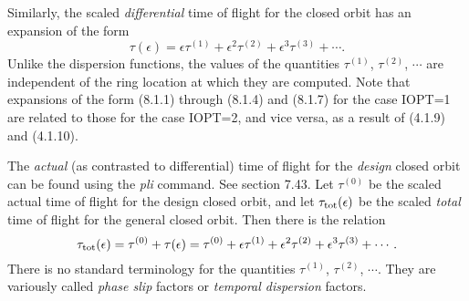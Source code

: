 Similarly, the scaled {\em differential} time of flight for the closed orbit has
an expansion of the form
\begin{equation}
\tau (\epsilon ) = \epsilon \tau^{(1)} + \epsilon^2 \tau^{(2)} +
\epsilon^3 \tau^{(3)} + \cdots.
\end{equation}
Unlike the dispersion functions, the values of the quantities
$\tau^{(1)}$, $\tau^{(2)}$, $\cdots$ are independent of the ring location at
which they are computed.  Note that expansions of the form (8.1.1) through
(8.1.4) and (8.1.7) for the case IOPT=1 are related to those for
the case IOPT=2, and vice versa, as a result of (4.1.9) and (4.1.10).

The {\em actual} (as contrasted to
differential) time of flight for the {\em design} closed orbit can be found
using the {\em pli} command.  See section 7.43.  Let $\tau^{(0)}$ be the
scaled actual time of flight for the design closed orbit, and let $\tau_{\rm
tot} (\epsilon )$ be the scaled {\em total} time of flight for the general
closed orbit.  Then there is the relation
\begin{equation}
\tau_{\rm tot}(\epsilon) = \tau^{(0)} + \tau (\epsilon) = \tau^{(0)} +
\epsilon \tau^{(1)} + \epsilon^2 \tau^{(2)} + \epsilon^3 \tau^{(3)} +
\cdots .
\end{equation}
There is no standard terminology for the quantities $\tau^{(1)}$, $\tau^{(2)}$,
$\cdots$.  They are variously called {\em phase slip} factors or {\em temporal
dispersion} factors.  

